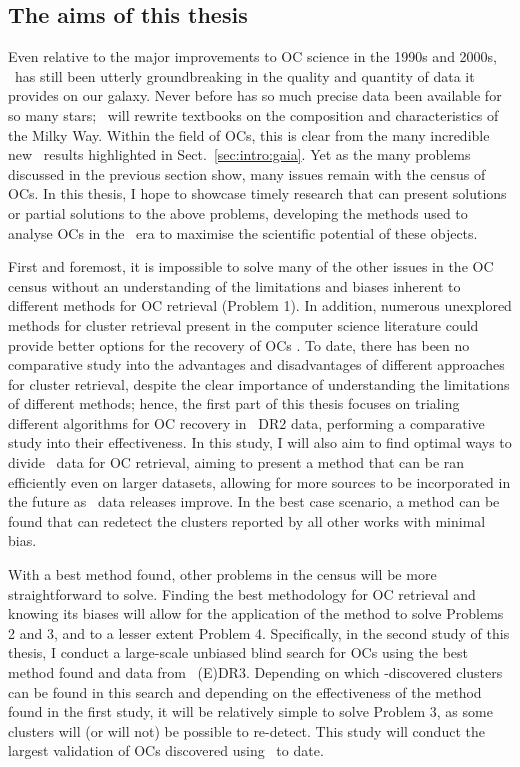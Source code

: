 \subsection{The aims of this thesis}
\label{sec:intro:issues:aims}

Even relative to the major improvements to OC science in the 1990s and 2000s, \gaia\ has still been utterly groundbreaking in the quality and quantity of data it provides on our galaxy. Never before has so much precise data been available for so many stars; \gaia\ will rewrite textbooks on the composition and characteristics of the Milky Way. Within the field of OCs, this is clear from the many incredible new \gaia\ results highlighted in Sect.~\ref{sec:intro:gaia}. Yet as the many problems discussed in the previous section show, many issues remain with the census of OCs. In this thesis, I hope to showcase timely research that can present solutions or partial solutions to the above problems, developing the methods used to analyse OCs in the \gaia\ era to maximise the scientific potential of these objects.

First and foremost, it is impossible to solve many of the other issues in the OC census without an understanding of the limitations and biases inherent to different methods for OC retrieval (Problem 1). In addition, numerous unexplored methods for cluster retrieval present in the computer science literature could provide better options for the recovery of OCs \citep{xu_comprehensive_2015}. To date, there has been no comparative study into the advantages and disadvantages of different approaches for cluster retrieval, despite the clear importance of understanding the limitations of different methods; hence, the first part of this thesis focuses on trialing different algorithms for OC recovery in \gaia\ DR2 data, performing a comparative study into their effectiveness. In this study, I will also aim to find optimal ways to divide \gaia\ data for OC retrieval, aiming to present a method that can be ran efficiently even on larger datasets, allowing for more sources to be incorporated in the future as \gaia\ data releases improve. In the best case scenario, a method can be found that can redetect the clusters reported by all other works with minimal bias.

With a best method found, other problems in the census will be more straightforward to solve. Finding the best methodology for OC retrieval and knowing its biases will allow for the application of the method to solve Problems 2 and 3, and to a lesser extent Problem 4. Specifically, in the second study of this thesis, I conduct a large-scale unbiased blind search for OCs using the best method found and data from \gaia\ (E)DR3. Depending on which \gaia-discovered clusters can be found in this search and depending on the effectiveness of the method found in the first study, it will be relatively simple to solve Problem 3, as some clusters will (or will not) be possible to re-detect. This study will conduct the largest validation of OCs discovered using \gaia\ to date.

